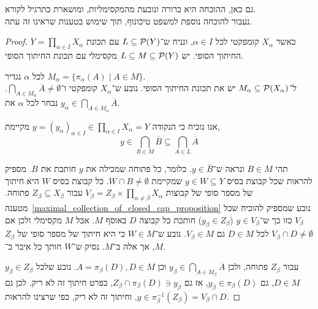 גם כאן, ההוכחה היא ברורה ונובעת מהמקסימליות, ומושארת כתרגיל לקורא. \\
נעבור להוכחה נוספת למשפט טיכונוף, תוך שימוש בטענות שראינו זה עתה.
\begin{proof}
	$Y = \prod_{\alpha \in I} X_{\alpha}$ כאשר $X_{\alpha}$ קומפקטי לכל $\alpha \in I$, ונניח ש־$L \subseteq \mathcal{P}(Y)$ עם תכונת החיתוך הסופי.
	יש $L \subseteq M \subseteq \mathcal{P}(Y)$ מקסימלי עם תכונת החיתוך הסופי.

	לכל $\alpha$ נגדיר $M_{\alpha} = \{ \pi_{\alpha}(A) \mid A \in M \}$. \\
	ל־$M_{\alpha} \subseteq \mathcal{P}(X_{\alpha})$ יש את תכונת החיתוך הסופי.
	נובע ש־$X_{\alpha}$ קומפקטי ו־$\bigcap_{A \in M_{\alpha}} \overline{A} \ne \emptyset$.
	נבחר לכל $\alpha$ את $y_{\alpha} \in \bigcap_{A \in M_{\alpha}} \overline{A}$.

	אנו נוכיח כי הנקודה $y = {( y_{\alpha} )}_{\alpha \in I} \in \prod_{\alpha \in I} X_{\alpha} = Y$ מקיימת,
	\[
		y \in \bigcap_{B \in M} \overline{B}
		\subseteq \bigcap_{A \in L} \overline{A}
	\]

	תהי $B \in M$ ונראה ש־$y \in \overline{B}$.
	כלומר, כל פתוחה שמכילה את $y$ חותכת את $B$.
	מספיק להראות שכל קבוצת בסיס $y \in W \subseteq Y$ שמקיימת $W \cap B \ne \emptyset$. 
	כל קבוצת בסיס $W$ היא חיתוך של מספר סופי של קבוצות $V_{\beta} = Z_{\beta} \times \prod_{\alpha \ne \beta} X_{\alpha}$ עבור $Z_{\beta} \subseteq X_{\beta}$ פתוחה.
	מטענה\ \ref{maximal_collection_of_closed_cap_proposition} נובע שמספיק להוכיח שכל $V_{\beta}$ כזו כך ש־$y \in V_{\beta}$ ($y_{\beta} \in Z_{\beta}$) חותכת כל קבוצה $D$ באוסף $M$.
	אבל $M$ מקסימלי ולכן אם $V_{\beta} \cap D \ne \emptyset$ לכל $D \in M$ גם $V_{\beta} \in M$.
	נובע ש־$W \in M$ כי היא חיתוך של מספר סופי של $Z_{\beta}$, אך אלה ב־$M$.
	נסיק ש־$W$ חותך כל איבר ב־$M$.

	$y_{\beta} \in Z_{\beta}$ עבור $Z_{\beta}$ פתוחה, ולכן $y_{\beta} \in \bigcap_{A \in M_{\beta}} \overline{A}$ וכן $A = \pi_{\beta}(D), D \in M$.
	נובע שלכל $D \in M$, גם $y_{\beta} \in \pi_{\beta}(D)$, אז גם $Z_{\beta} \cap \pi_{\beta}(D) \ni y_{\beta}$, בפרט חיתוך זה לא ריק.
	לכן גם $y \in \pi_{\beta}^{-1}(Z_{\beta}) = V_{\beta} \cap D$, וחיתוך זה לא ריק, כפי שרצינו להראות.
\end{proof}

\listoftheorems[title=הגדרות ומשפטים,ignoreall,show={theorem,definition},swapnumber,onlynamed={proposition}]


